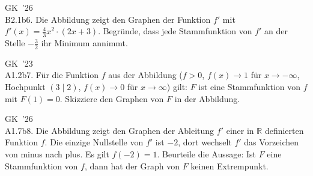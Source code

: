 \documentclass[11pt]{article}
\newcommand{\gzwei}[2]{\par\smallskip\noindent\sbox{\gbox}{#1}%
  \setlength{\gLinks}{\dimexpr\wd\gbox+6mm\relax}%
  \ifdim\gLinks>0.62\linewidth
    \usebox{\gbox}\par\smallskip\noindent\begin{minipage}{\linewidth}#2\end{minipage}%
  \else
    \begin{minipage}[t]{\gLinks}\vspace{0pt}\usebox{\gbox}\end{minipage}%
    \begin{minipage}[t]{\dimexpr\linewidth-\gLinks\relax}\vspace{0pt}\raggedright #2\end{minipage}%
  \fi\par}
\def\gkopfnach{}
\newcommand{\gkopfvor}[1]{\gdef\gkopfnach{#1}}
\newcommand{\karo}[1]{\par\smallskip\noindent\begin{tikzpicture}
  \clip (0,0) rectangle ({\linewidth-1mm},{#1*10mm});
  \draw[black!16,line width=0.3pt,step=5mm] (0,0) grid ({\linewidth},{#1*10mm});
  \end{tikzpicture}\par}
\begin{document}
\gkopfvor{\pfstufekopf{Stammfunktion am Graphen lesen}{\gpunkte[26 24 23]{\textcolor{black!80}{$\bullet$}\,\textcolor{black!25}{$\circ$}\,\textcolor{black!80}{$\bullet$}\,\textcolor{black!80}{$\bullet$}\,\textcolor{black!25}{$\circ$}}}\special{pdf:dest (stufe-stammfunktion-am-graphen-lesen) [@thispage /XYZ @xpos @ypos null]}}
\begin{pfaufg}{GK~’26\\B2.1b}{6.}{}
Die Abbildung zeigt den Graphen der Funktion $f'$ mit $f'(x) = \tfrac{4}{3}x^2 \cdot (2x + 3)$. Begründe, dass jede Stammfunktion von $f'$ an der Stelle $-\tfrac{3}{2}$ ihr Minimum annimmt.
\gzwei{\begin{abiksys}[xmin=-2,xmax=0.75,ymin=-6,ymax=3,le=1.5,yle=0.4,xstep=0.5]\funktion[-1.8]{4/3*\x^2*(2*\x+3)}{G_{f'}}\end{abiksys}}{\karo{4}}
\end{pfaufg}
\begin{pfaufg}{GK~’23\\A1.2b}{7.}{\pfohnetr}
Für die Funktion $f$ aus der Abbildung ($f > 0$, $f(x) \to 1$ für $x \to -\infty$, Hochpunkt $(3 \mid 2)$, $f(x) \to 0$ für $x \to \infty$) gilt: $F$ ist eine Stammfunktion von $f$ mit $F(1) = 0$. Skizziere den Graphen von $F$ in der Abbildung.
\par\smallskip\noindent\begin{abiksys}[xmin=-3,xmax=9,ymin=-1,ymax=9,le=0.4]\end{abiksys}\par
{}
\end{pfaufg}
\begin{pfaufg}{GK~’26\\A1.7b}{8.}{\pfohnetr}
Die Abbildung zeigt den Graphen der Ableitung $f'$ einer in $\mathbb{R}$ definierten Funktion $f$. Die einzige Nullstelle von $f'$ ist $-2$, dort wechselt $f'$ das Vorzeichen von minus nach plus. Es gilt $f(-2) = 1$. Beurteile die Aussage: Ist $F$ eine Stammfunktion von $f$, dann hat der Graph von $F$ keinen Extrempunkt.
\gzwei{\begin{abiksys}[xmin=-4,xmax=4,ymin=-3,ymax=4,le=0.4]\funktion[3]{3*(\x+2)*exp(-\x-1)}{G_{f'}}\end{abiksys}}{\karo{4}}
\end{pfaufg}
\end{document}
